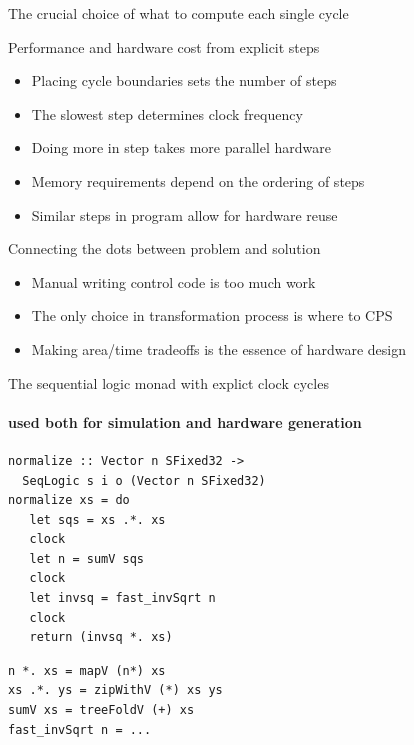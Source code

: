 \documentclass[pdf]{beamer}
\begin{document}
\begin{frame}{The crucial choice of what to compute each single cycle}


\begin{block}{Performance and hardware cost from explicit steps}
\begin{itemize}
\item Placing cycle boundaries sets the number of steps
\item The slowest step determines clock frequency
\item Doing more in step takes more parallel hardware
\item Memory requirements depend on the ordering of steps
\item Similar steps in program allow for hardware reuse
\end{itemize}
\end{block}

\begin{block}{Connecting the dots between problem and solution}
\begin{itemize}
\item Manual writing control code is too much work
\item The only choice in transformation process is where to CPS
\item Making area/time tradeoffs is the essence of hardware design
\end{itemize}
\end{block}


\end{frame}


\begin{frame}[fragile]{The sequential logic monad with explict clock cycles}
\framesubtitle{used both for simulation and hardware generation}
\begin{block}{}
\begin{verbatim}
normalize :: Vector n SFixed32 -> 
  SeqLogic s i o (Vector n SFixed32)
normalize xs = do
   let sqs = xs .*. xs
   clock
   let n = sumV sqs
   clock
   let invsq = fast_invSqrt n
   clock
   return (invsq *. xs)
\end{verbatim}
\end{block}

\begin{block}{}
\begin{verbatim}
n *. xs = mapV (n*) xs
xs .*. ys = zipWithV (*) xs ys
sumV xs = treeFoldV (+) xs
fast_invSqrt n = ...
\end{verbatim}
\end{block}

\end{frame}
\end{document}
